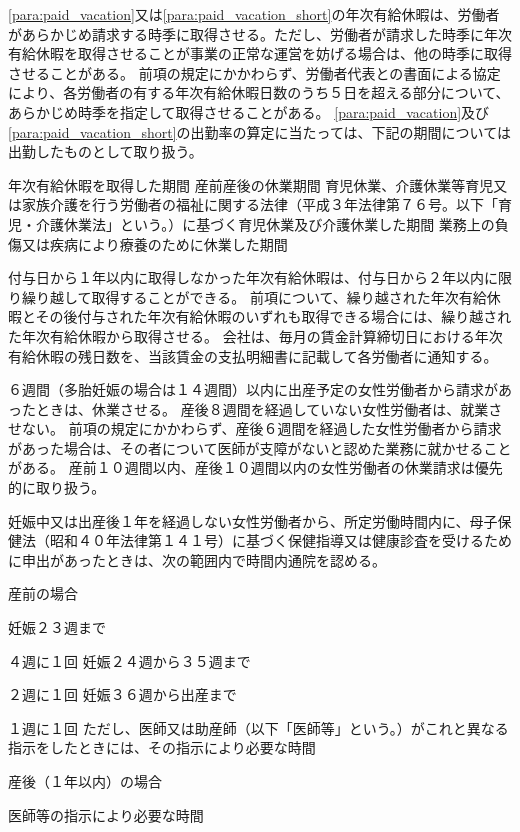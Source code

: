 \documentclass[10pt,a4paper,uplatex]{jsarticle}
\begin{document}
\label{para:paid_vacation_short}
\term
\ref{para:paid_vacation}又は\ref{para:paid_vacation_short}の年次有給休暇は、労働者があらかじめ請求する時季に取得させる。ただし、労働者が請求した時季に年次有給休暇を取得させることが事業の正常な運営を妨げる場合は、他の時季に取得させることがある。
\term
前項の規定にかかわらず、労働者代表との書面による協定により、各労働者の有する年次有給休暇日数のうち５日を超える部分について、あらかじめ時季を指定して取得させることがある。
\term
\ref{para:paid_vacation}及び\ref{para:paid_vacation_short}の出勤率の算定に当たっては、下記の期間については出勤したものとして取り扱う。
\begin{enumerate}
    \itm 年次有給休暇を取得した期間
    \itm 産前産後の休業期間
    \itm 育児休業、介護休業等育児又は家族介護を行う労働者の福祉に関する法律（平成３年法律第７６号。以下「育児・介護休業法」という。）に基づく育児休業及び介護休業した期間
    \itm 業務上の負傷又は疾病により療養のために休業した期間
\end{enumerate}
\term
付与日から１年以内に取得しなかった年次有給休暇は、付与日から２年以内に限り繰り越して取得することができる。
\term
前項について、繰り越された年次有給休暇とその後付与された年次有給休暇のいずれも取得できる場合には、繰り越された年次有給休暇から取得させる。
\term
会社は、毎月の賃金計算締切日における年次有給休暇の残日数を、当該賃金の支払明細書に記載して各労働者に通知する。

６週間（多胎妊娠の場合は１４週間）以内に出産予定の女性労働者から請求があったときは、休業させる。
\term
産後８週間を経過していない女性労働者は、就業させない。
\term
前項の規定にかかわらず、産後６週間を経過した女性労働者から請求があった場合は、その者について医師が支障がないと認めた業務に就かせることがある。
\term
産前１０週間以内、産後１０週間以内の女性労働者の休業請求は優先的に取り扱う。
 

妊娠中又は出産後１年を経過しない女性労働者から、所定労働時間内に、母子保健法（昭和４０年法律第１４１号）に基づく保健指導又は健康診査を受けるために申出があったときは、次の範囲内で時間内通院を認める。
\begin{enumerate}
    \itm 産前の場合
    \begin{enumerate}
        \itm 妊娠２３週まで\par ４週に１回
        \itm 妊娠２４週から３５週まで\par ２週に１回
        \itm 妊娠３６週から出産まで\par １週に１回
        \itm ただし、医師又は助産師（以下「医師等」という。）がこれと異なる指示をしたときには、その指示により必要な時間
    \end{enumerate}
    \itm 産後（１年以内）の場合
    \begin{enumerate}
        \itm 医師等の指示により必要な時間
    \end{enumerate}
\end{enumerate}
\end{document}
